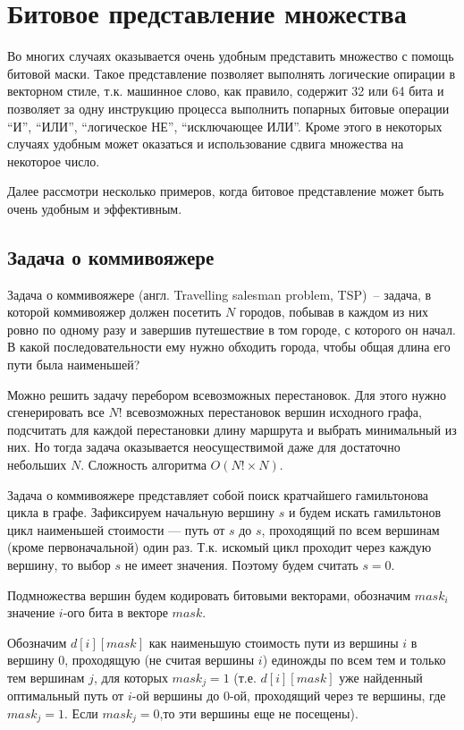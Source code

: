 \section{Битовое представление множества}
Во многих случаях оказывается очень удобным представить множество с помощь битовой маски.
Такое представление позволяет выполнять логические опирации в векторном стиле, т.к. машинное слово,
как правило, содержит 32 или 64 бита и позволяет за одну инструкцию процесса выполнить попарных битовые операции ``И'', ``ИЛИ'', ``логическое НЕ'', ``исключающее ИЛИ''. Кроме этого в некоторых случаях удобным может оказаться и использование сдвига множества на некоторое число.

Далее рассмотри несколько примеров, когда битовое представление может быть очень удобным и эффективным.

\subsection{Задача о коммивояжере}

Задача о коммивояжере (англ. Travelling salesman problem, TSP)~-- задача, в которой коммивояжер должен посетить $N$ городов, побывав в каждом из них ровно по одному разу и завершив путешествие в том городе, с которого он начал. В какой последовательности ему нужно обходить города, чтобы общая длина его пути была наименьшей?

Можно решить задачу перебором всевозможных перестановок. Для этого нужно сгенерировать все $N!$ всевозможных перестановок вершин исходного графа, подсчитать для каждой перестановки длину маршрута и выбрать минимальный из них. Но тогда задача оказывается неосуществимой даже для достаточно небольших $N$. Сложность алгоритма $O(N! \times N)$.

Задача о коммивояжере представляет собой поиск кратчайшего гамильтонова цикла в графе. Зафиксируем начальную вершину $s$ и будем искать гамильтонов цикл наименьшей стоимости — путь от $s$ до $s$, проходящий по всем вершинам (кроме первоначальной) один раз. Т.к. искомый цикл проходит через каждую вершину, то выбор $s$ не имеет значения. Поэтому будем считать $s=0$.

Подмножества вершин будем кодировать битовыми векторами, обозначим $mask_i$ значение $i$-ого бита в векторе $mask$.

Обозначим $d[i][mask]$ как наименьшую стоимость пути из вершины $i$ в вершину $0$, проходящую (не считая вершины $i$) единожды по всем тем и только тем вершинам $j$, для которых $mask_{j}=1$ (т.е. $d[i][mask]$ уже найденный оптимальный путь от $i$-ой вершины до $0$-ой, проходящий через те вершины, где $mask_{j}=1$. Если $mask_{j}=0$,то эти вершины еще не посещены).

